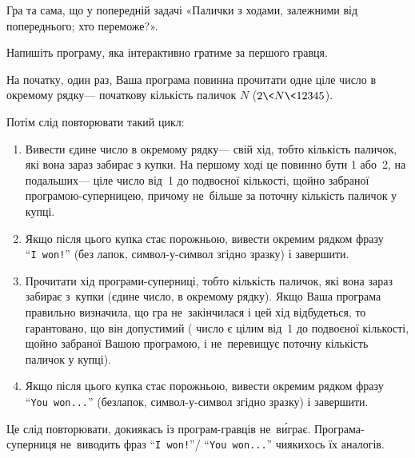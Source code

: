 
Гра та сама, що у попередній 
задачі «Палички з ходами, залежними від попереднього; хто переможе?».

Напишіть програму, яка інтерактивно гратиме за першого гравця. 

На початку, один раз, Ваша програма повинна прочитати одне ціле число в окремому рядку\nolinebreak[3] --- початкову кількість паличок $N$ ($2{\<}N{\<}12345$).

Потім слід повторювати такий цикл:
\begin{enumerate}
\item{}
Вивести єдине число в окремому рядку\nolinebreak[3] --- свій хід, тобто кількість паличок, які вона зараз забирає з купки.
На першому ході це повинно бути 1 або~2, на подальших\nolinebreak[2] --- ціле число від~1 до подвоєної кількості, щойно забраної про\-гра\-мою-суперницею, причому не~більше за поточну кількість паличок у купці. 
\item
Якщо після цього купка стає порожньою, 
вивести окремим рядком фразу ``\texttt{I~won!}''
(без лапок, символ-у-символ згідно зразку) і завершити. %
\item
Прочитати хід програми-суперниці, тобто кількість паличок, які вона зараз забирає з~купки (єдине %
число, в окремому рядку).
Якщо Ваша програма правильно визначила, що гра %
не~закінчилася і цей хід %
відбудеться, то гарантовано, що він допустимий (%
число є цілим від~1 до подвоєної кількості, щойно забраної Вашою програмою, і не~перевищує поточну кількість паличок у купці).
\item
Якщо після цього купка стає порожньою, 
вивести окремим рядком 
фразу ``\texttt{You~won...}''
(без\nolinebreak[3] лапок, символ-у-символ згідно зразку) і завершити. %
\end{enumerate}
Це слід повторювати, 
доки\nolinebreak[3] якась із програм-гравців не~в\'{и}грає.
Програма-суперниця не~виводить фраз ``\texttt{I~won!}''\nolinebreak[2] / ``\texttt{You~won...}'' 
чи\nolinebreak[2] якихось їх аналогів.

